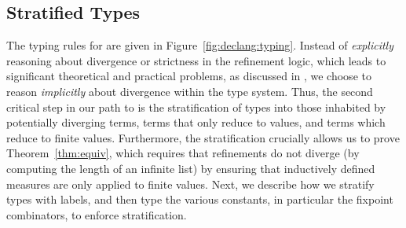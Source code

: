 


\subsection{Stratified Types}\label{sec:typing:stratify}

The typing rules for \declang are given in Figure~\ref{fig:declang:typing}.
Instead of \emph{explicitly} reasoning about divergence or 
strictness in the refinement logic, which leads to significant
theoretical and practical problems, as discussed in , 
we choose to reason \emph{implicitly} about divergence within the type system.
%
Thus, the second critical step in our path to \declang is the 
stratification of types into those inhabited by potentially
diverging terms, terms that only reduce to values, and 
terms which reduce to finite values.
%
Furthermore, the stratification crucially allows us to prove 
Theorem~\ref{thm:equiv}, which requires that refinements do 
not diverge (\eg by computing the length of an infinite list)
by ensuring that inductively defined measures are only applied 
to finite values.
%
Next, we describe how we stratify types with labels, and 
then type the various constants, in particular the fixpoint 
combinators, to enforce stratification.

